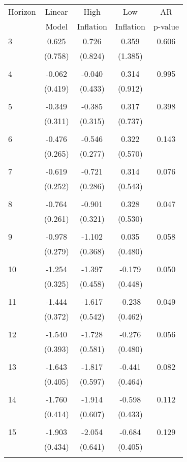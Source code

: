 \begin{tabular}{l*{1}{cccc}}
\hline\hline
 Horizon  & Linear & High                 & Low           & AR            \\
                  & Model         & Inflation & Inflation & p-value       \\
\hline
   3       & 0.625 & 0.726 & 0.359 & 0.606 \\
          & (0.758) & (0.824) & (1.385) & \\
 & & & &\\
   4       & -0.062 & -0.040 & 0.314 & 0.995 \\
          & (0.419) & (0.433) & (0.912) & \\
 & & & &\\
   5       & -0.349 & -0.385 & 0.317 & 0.398 \\
          & (0.311) & (0.315) & (0.737) & \\
 & & & &\\
   6       & -0.476 & -0.546 & 0.322 & 0.143 \\
          & (0.265) & (0.277) & (0.570) & \\
 & & & &\\
   7       & -0.619 & -0.721 & 0.314 & 0.076 \\
          & (0.252) & (0.286) & (0.543) & \\
 & & & &\\
   8       & -0.764 & -0.901 & 0.328 & 0.047 \\
          & (0.261) & (0.321) & (0.530) & \\
 & & & &\\
   9       & -0.978 & -1.102 & 0.035 & 0.058 \\
          & (0.279) & (0.368) & (0.480) & \\
 & & & &\\
  10       & -1.254 & -1.397 & -0.179 & 0.050 \\
          & (0.325) & (0.458) & (0.448) & \\
 & & & &\\
  11       & -1.444 & -1.617 & -0.238 & 0.049 \\
          & (0.372) & (0.542) & (0.462) & \\
 & & & &\\
  12       & -1.540 & -1.728 & -0.276 & 0.056 \\
          & (0.393) & (0.581) & (0.480) & \\
 & & & &\\
  13       & -1.643 & -1.817 & -0.441 & 0.082 \\
          & (0.405) & (0.597) & (0.464) & \\
 & & & &\\
  14       & -1.760 & -1.914 & -0.598 & 0.112 \\
          & (0.414) & (0.607) & (0.433) & \\
 & & & &\\
  15       & -1.903 & -2.054 & -0.684 & 0.129 \\
          & (0.434) & (0.641) & (0.405) & \\
 & & & &\\
\hline\hline
\end{tabular}
